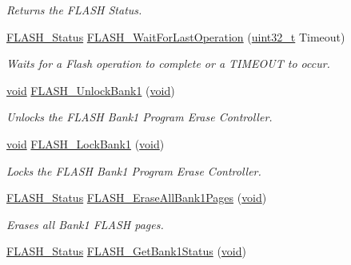 \begin{DoxyCompactItemize}
\begin{DoxyCompactList}\small\item\em Returns the F\+L\+A\+SH Status. \end{DoxyCompactList}\item 
\hyperlink{group___f_l_a_s_h___exported___types_gadc63a6f3404ff1f71229a66915e9cdc0}{F\+L\+A\+S\+H\+\_\+\+Status} \hyperlink{group___f_l_a_s_h___exported___functions_ga2ad803999ae93ec03700983c59cae264}{F\+L\+A\+S\+H\+\_\+\+Wait\+For\+Last\+Operation} (\hyperlink{_p_e___types_8h_a33594304e786b158f3fb30289278f5af}{uint32\+\_\+t} Timeout)
\begin{DoxyCompactList}\small\item\em Waits for a Flash operation to complete or a T\+I\+M\+E\+O\+UT to occur. \end{DoxyCompactList}\item 
\hyperlink{usb__devapi_8h_afabf60e7f57651d6d595a02c75f07cd0}{void} \hyperlink{group___f_l_a_s_h___exported___functions_ga358c4b7e0ef20693ca62cc9d20c94a5a}{F\+L\+A\+S\+H\+\_\+\+Unlock\+Bank1} (\hyperlink{usb__devapi_8h_afabf60e7f57651d6d595a02c75f07cd0}{void})
\begin{DoxyCompactList}\small\item\em Unlocks the F\+L\+A\+SH Bank1 Program Erase Controller. \end{DoxyCompactList}\item 
\hyperlink{usb__devapi_8h_afabf60e7f57651d6d595a02c75f07cd0}{void} \hyperlink{group___f_l_a_s_h___exported___functions_gafe4188ab9eb12c046970660f65a3faf9}{F\+L\+A\+S\+H\+\_\+\+Lock\+Bank1} (\hyperlink{usb__devapi_8h_afabf60e7f57651d6d595a02c75f07cd0}{void})
\begin{DoxyCompactList}\small\item\em Locks the F\+L\+A\+SH Bank1 Program Erase Controller. \end{DoxyCompactList}\item 
\hyperlink{group___f_l_a_s_h___exported___types_gadc63a6f3404ff1f71229a66915e9cdc0}{F\+L\+A\+S\+H\+\_\+\+Status} \hyperlink{group___f_l_a_s_h___exported___functions_ga2036728450ee18e789b25fe3fd9c80ee}{F\+L\+A\+S\+H\+\_\+\+Erase\+All\+Bank1\+Pages} (\hyperlink{usb__devapi_8h_afabf60e7f57651d6d595a02c75f07cd0}{void})
\begin{DoxyCompactList}\small\item\em Erases all Bank1 F\+L\+A\+SH pages. \end{DoxyCompactList}\item 
\hyperlink{group___f_l_a_s_h___exported___types_gadc63a6f3404ff1f71229a66915e9cdc0}{F\+L\+A\+S\+H\+\_\+\+Status} \hyperlink{group___f_l_a_s_h___exported___functions_ga9d5b76b75ef4c578cc45dc836a1929b6}{F\+L\+A\+S\+H\+\_\+\+Get\+Bank1\+Status} (\hyperlink{usb__devapi_8h_afabf60e7f57651d6d595a02c75f07cd0}{void})

\end{DoxyCompactItemize}
